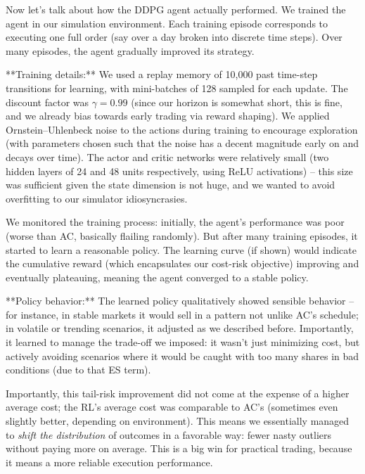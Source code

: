 \documentclass[11pt]{article}
\begin{document}
	
	
		Now let’s talk about how the DDPG agent actually performed. We trained the agent in our simulation environment. Each training episode corresponds to executing one full order (say over a day broken into discrete time steps). Over many episodes, the agent gradually improved its strategy.
		
		**Training details:** We used a replay memory of 10,000 past time-step transitions for learning, with mini-batches of 128 sampled for each update. The discount factor was $\gamma=0.99$ (since our horizon is somewhat short, this is fine, and we already bias towards early trading via reward shaping). We applied Ornstein–Uhlenbeck noise to the actions during training to encourage exploration (with parameters chosen such that the noise has a decent magnitude early on and decays over time). The actor and critic networks were relatively small (two hidden layers of 24 and 48 units respectively, using ReLU activations) – this size was sufficient given the state dimension is not huge, and we wanted to avoid overfitting to our simulator idiosyncrasies.
		
		We monitored the training process: initially, the agent’s performance was poor (worse than AC, basically flailing randomly). But after many training episodes, it started to learn a reasonable policy. The learning curve (if shown) would indicate the cumulative reward (which encapsulates our cost-risk objective) improving and eventually plateauing, meaning the agent converged to a stable policy.
		
		**Policy behavior:** The learned policy qualitatively showed sensible behavior – for instance, in stable markets it would sell in a pattern not unlike AC’s schedule; in volatile or trending scenarios, it adjusted as we described before. Importantly, it learned to manage the trade-off we imposed: it wasn’t just minimizing cost, but actively avoiding scenarios where it would be caught with too many shares in bad conditions (due to that ES term).
		

		
		Importantly, this tail-risk improvement did not come at the expense of a higher average cost; the RL’s average cost was comparable to AC’s (sometimes even slightly better, depending on environment). This means we essentially managed to \textit{shift the distribution} of outcomes in a favorable way: fewer nasty outliers without paying more on average. This is a big win for practical trading, because it means a more reliable execution performance.
		
\end{document}
